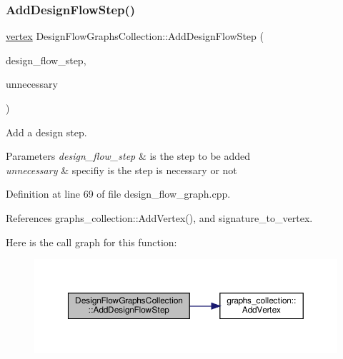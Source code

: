 \subsubsection{\texorpdfstring{Add\+Design\+Flow\+Step()}{AddDesignFlowStep()}}
{\footnotesize\ttfamily \hyperlink{graph_8hpp_abefdcf0544e601805af44eca032cca14}{vertex} Design\+Flow\+Graphs\+Collection\+::\+Add\+Design\+Flow\+Step (\begin{DoxyParamCaption}\item[{const \hyperlink{design__flow__step_8hpp_a9dd6b4474ddf52d41a78b1aaa12ae6c8}{Design\+Flow\+Step\+Ref}}]{design\+\_\+flow\+\_\+step,  }\item[{const bool}]{unnecessary }\end{DoxyParamCaption})}



Add a design step. 


\begin{DoxyParams}{Parameters}
{\em design\+\_\+flow\+\_\+step} & is the step to be added \\
\hline
{\em unnecessary} & specifiy is the step is necessary or not \\
\hline
\end{DoxyParams}


Definition at line 69 of file design\+\_\+flow\+\_\+graph.\+cpp.



References graphs\+\_\+collection\+::\+Add\+Vertex(), and signature\+\_\+to\+\_\+vertex.

Here is the call graph for this function\+:
\nopagebreak
\begin{figure}[H]
\begin{center}
\leavevmode
\includegraphics[width=350pt]{d8/dcb/classDesignFlowGraphsCollection_abcc51a4113bec717c5ca63818d3543f9_cgraph}
\end{center}
\end{figure}
\mbox{\label{classDesignFlowGraphsCollection_ad960e246ee04d5b39d48d58d63b875c3}} 

